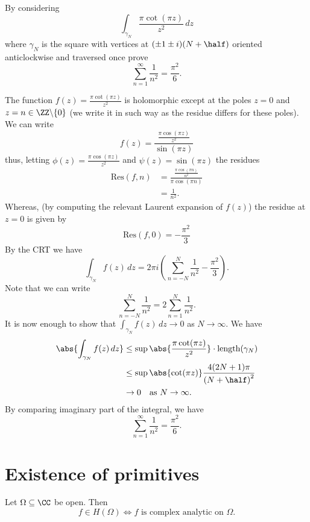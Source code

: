 \documentclass[12pt, a4paper]{article}
\begin{document}
\begin{mdexample}
    By considering 
    \[\int_{\gamma_N} \frac{\pi \cot(\pi z)}{z^2} \, dz\]
    where \(\gamma_N\) is the square with vertices at \((\pm 1\pm i)(N+\half)\) oriented anticlockwise and traversed once prove 
    \[\sum_{n=1}^{\infty} \frac{1}{n^2} = \frac{\pi^2}{6}.\]
    \begin{solution}
        The function \(f(z) = \frac{\pi \cot(\pi z)}{z^2}\) is holomorphic except at the poles \(z=0\) and \(z = n \in \ZZ \backslash \{0\}\) (we write it in such way as the residue differs for these poles). We can write 
        \[f(z) = \frac{\frac{\pi \cos(\pi z)}{z^2}}{\sin(\pi z)}\]
        thus, letting \(\phi(z) = \frac{\pi \cos(\pi z)}{z^2}\) and \(\psi(z)=\sin(\pi z)\) the residues 
        \[\begin{aligned}
            \text{Res}(f,n) &= \frac{\frac{\pi \cos(\pi n)}{n^2}}{\pi \cos(\pi n)} \\
            &= \frac{1}{n^2}.
        \end{aligned}\]
        Whereas, (by computing the relevant Laurent expansion of \(f(z)\)) the residue at \(z=0\) is given by 
        \[\text{Res}(f,0)=-\frac{\pi^2}{3}\]
        By the CRT we have 
        \[\int_{\gamma_N} f(z) \, dz = 2\pi i \left( \sum_{n=-N}^{N} \frac{1}{n^2} - \frac{\pi^2}{3} \right).\]
        Note that we can write 
        \[\sum_{n=-N}^{N} \frac{1}{n^2} = 2\sum_{n=1}^{N} \frac{1}{n^2}.\]
        It is now enough to show that \(\int_{\gamma_N} f(z) \, dz \to 0\) as \(N\to \infty\). We have 
        \[\begin{aligned}
            \abs{\int_{\gamma_N} f(z) \, dz} &\leq \sup \abs{\frac{\pi \cot(\pi z)}{z^2}} \cdot \text{length}(\gamma_N) \\
            &\leq \sup \abs{\cot(\pi z)} \frac{4(2N+1)\pi}{\left( N+\half \right)^2} \\
            & \to 0 \quad \text{as \(N \to \infty\)}.
        \end{aligned}\]
        By comparing imaginary part of the integral, we have 
        \[\sum_{n=1}^{\infty} \frac{1}{n^2} = \frac{\pi^2}{6}.\]
    \end{solution}
\end{mdexample}

\section{Existence of primitives}

\begin{mdthm}
    Let \(\Omega \subseteq \CC\) be open. Then 
    \[f\in H(\Omega) \iff f \text{ is complex analytic on } \Omega.\]
\end{mdthm}
\end{document}
